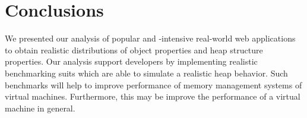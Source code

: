 
\section{Conclusions}

We presented our analysis of popular and \JS-intensive real-world web
applications to obtain realistic distributions of object properties and heap
structure properties. Our analysis support developers by implementing realistic
\JS benchmarking suits which are able to simulate a realistic \JS heap
behavior. Such benchmarks will help to improve performance of memory management
systems of \JS virtual machines. Furthermore, this may be improve the
performance of a \JS virtual machine in general.